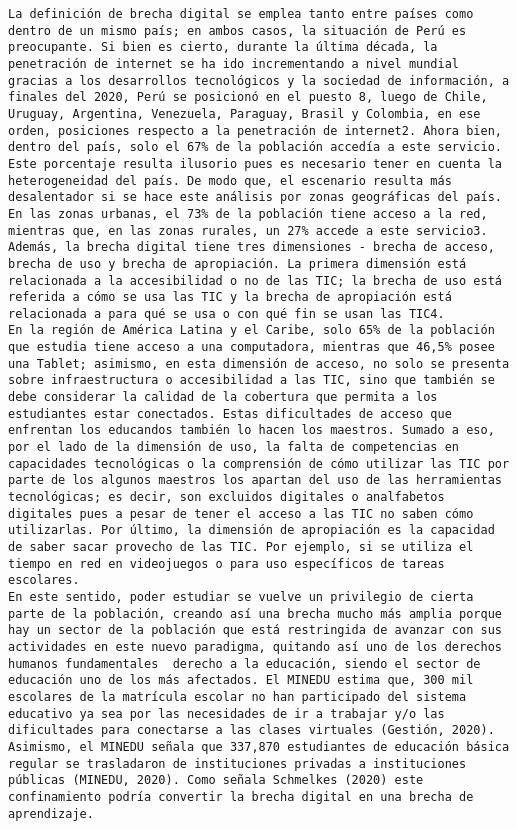 \begin{enumerate}
\begin{verbatim}
La definición de brecha digital se emplea tanto entre países como dentro de un mismo país; en ambos casos, la situación de Perú es preocupante. Si bien es cierto, durante la última década, la penetración de internet se ha ido incrementando a nivel mundial gracias a los desarrollos tecnológicos y la sociedad de información, a finales del 2020, Perú se posicionó en el puesto 8, luego de Chile, Uruguay, Argentina, Venezuela, Paraguay, Brasil y Colombia, en ese orden, posiciones respecto a la penetración de internet2. Ahora bien, dentro del país, solo el 67% de la población accedía a este servicio. Este porcentaje resulta ilusorio pues es necesario tener en cuenta la heterogeneidad del país. De modo que, el escenario resulta más desalentador si se hace este análisis por zonas geográficas del país. En las zonas urbanas, el 73% de la población tiene acceso a la red, mientras que, en las zonas rurales, un 27% accede a este servicio3. 
Además, la brecha digital tiene tres dimensiones - brecha de acceso, brecha de uso y brecha de apropiación. La primera dimensión está relacionada a la accesibilidad o no de las TIC; la brecha de uso está referida a cómo se usa las TIC y la brecha de apropiación está relacionada a para qué se usa o con qué fin se usan las TIC4. 
En la región de América Latina y el Caribe, solo 65% de la población que estudia tiene acceso a una computadora, mientras que 46,5% posee una Tablet; asimismo, en esta dimensión de acceso, no solo se presenta sobre infraestructura o accesibilidad a las TIC, sino que también se debe considerar la calidad de la cobertura que permita a los estudiantes estar conectados. Estas dificultades de acceso que enfrentan los educandos también lo hacen los maestros. Sumado a eso, por el lado de la dimensión de uso, la falta de competencias en capacidades tecnológicas o la comprensión de cómo utilizar las TIC por parte de los algunos maestros los apartan del uso de las herramientas tecnológicas; es decir, son excluidos digitales o analfabetos digitales pues a pesar de tener el acceso a las TIC no saben cómo utilizarlas. Por último, la dimensión de apropiación es la capacidad de saber sacar provecho de las TIC. Por ejemplo, si se utiliza el tiempo en red en videojuegos o para uso específicos de tareas escolares.
En este sentido, poder estudiar se vuelve un privilegio de cierta parte de la población, creando así una brecha mucho más amplia porque hay un sector de la población que está restringida de avanzar con sus actividades en este nuevo paradigma, quitando así uno de los derechos humanos fundamentales  derecho a la educación, siendo el sector de educación uno de los más afectados. El MINEDU estima que, 300 mil escolares de la matrícula escolar no han participado del sistema educativo ya sea por las necesidades de ir a trabajar y/o las dificultades para conectarse a las clases virtuales (Gestión, 2020). Asimismo, el MINEDU señala que 337,870 estudiantes de educación básica regular se trasladaron de instituciones privadas a instituciones públicas (MINEDU, 2020). Como señala Schmelkes (2020) este confinamiento podría convertir la brecha digital en una brecha de aprendizaje.

\end{verbatim}
\end{enumerate}
